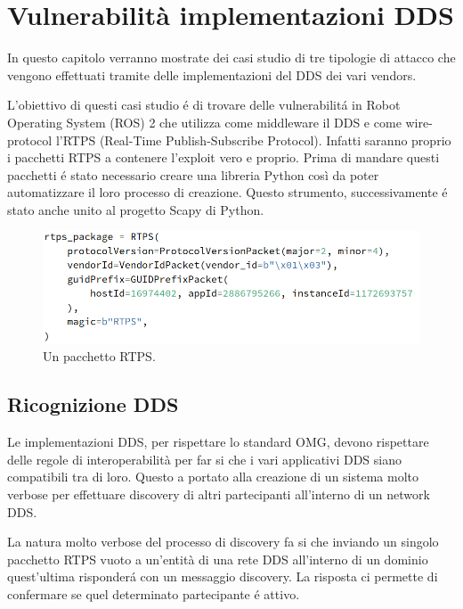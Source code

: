 \chapter{Vulnerabilità implementazioni DDS}

In questo capitolo verranno mostrate dei casi studio
di tre tipologie di 
attacco che vengono effettuati tramite delle 
implementazioni del DDS dei vari vendors.

L'obiettivo di questi casi studio é di trovare delle 
vulnerabilitá in Robot Operating System (ROS) 2 che 
utilizza come middleware il DDS e come wire-protocol 
l'RTPS (Real-Time Publish-Subscribe Protocol).
Infatti saranno proprio i pacchetti RTPS a contenere 
l'exploit vero e proprio. Prima di mandare questi 
pacchetti é stato necessario creare una libreria Python 
così da poter automatizzare il loro processo di creazione.
Questo strumento, successivamente é stato anche unito al 
progetto Scapy di Python.

\begin{figure}[H]
    \centering
    \includegraphics[width=15.2cm, keepaspectratio]{img/rptspacketheaderscapy.png}
    \caption{Un pacchetto RTPS.}
    \label{rptspacketheaderscapy}
\end{figure}

\section{Ricognizione DDS}
Le implementazioni DDS, per rispettare lo standard 
OMG, devono rispettare delle regole di interoperabilità 
per far si che i vari applicativi DDS siano compatibili 
tra di loro. Questo a portato alla creazione di un sistema
molto verbose per effettuare discovery 
di altri partecipanti all'interno di un network DDS.


La natura molto verbose del processo di discovery 
fa si che inviando un singolo pacchetto RTPS vuoto 
a un'entità di una rete DDS all'interno di un dominio 
quest'ultima risponderá 
con un messaggio discovery. La risposta ci permette di 
confermare se quel determinato partecipante é attivo.

